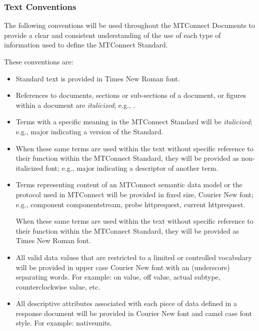 \documentclass{mtconnect}	%
\begin{document}
\subsubsection{Text Conventions}

The following conventions will be used throughout the MTConnect Documents to provide a clear and consistent understanding of the use of each type of information used to define the MTConnect Standard.

These conventions are:

\begin{itemize}
\item	Standard text is provided in Times New Roman font.

\item	References to documents, sections or sub-sections of a document, or figures within a document are \textit{italicized}; e.g., .

\item 	Terms with a specific meaning in the MTConnect Standard will be \textit{italicized}; e.g., \gls{major} indicating a version of the Standard.

\item 	When these same terms are used within the text without specific reference to their function within the MTConnect Standard, they will be provided as non-italicized font; e.g., major indicating a descriptor of another term.

\item 	Terms representing content of an MTConnect \gls{semantic data model} or the protocol used in MTConnect will be provided in fixed size, Courier New font; e.g., \gls{component componentstream}, \gls{probe httprequest}, \gls{current httprequest}.   

\tab When these same terms are used within the text without specific reference to their function within the MTConnect Standard, they will be provided as Times New Roman font.

\item	All \glspl{valid data value} that are restricted to a limited or controlled vocabulary will be provided in upper case Courier New font with an \textunderscore  (underscore) separating words.  For example: \gls{on value}, \gls{off value}, \gls{actual subtype}, \gls{counterclockwise value}, etc.

\item 	All descriptive attributes associated with each piece of data defined in a \gls{response document} will be provided in Courier New font and camel case font style.  For example: \gls{nativeunits}.
\end{itemize}
\end{document}
